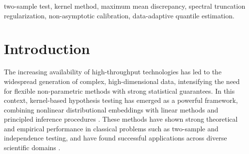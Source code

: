 \documentclass[twoside,11pt]{article}
\begin{document}
\begin{abstract}%
Kernel methods provide a flexible and powerful framework for nonparametric statistical testing by embedding probability distributions into a reproducing kernel Hilbert space (RKHS). In this work, we study the kernel two-sample testing problem and focus on a normalized version of the Maximum Mean Discrepancy (MMD) as a test statistic, which scales the discrepancy by the within-group covariance operator to account for data variability. This normalization has been shown to improve test power in both theoretical and empirical settings. Because this normalization requires regularization, we study the non-asymptotic properties of the spectrally truncated normalized MMD (st-nMMD) and derive an exponential upper bound under the null hypothesis. Thanks to this result we propose a sharp and explicit upper bound for the corresponding non-asymptotic quantile, along with a data-adaptive estimator. We further propose an algorithm to tune the hyperparameters involved in the quantile estimation, including the truncation level, without requiring data splitting. We demonstrate the performance of the st-nMMD through numerical experiments under both the null and alternative hypotheses.
\end{abstract}


\begin{keywords}
  two-sample test, kernel method, maximum mean discrepancy, spectral truncation regularization, non-asymptotic calibration, data-adaptive quantile estimation. 
\end{keywords}


\section{Introduction}\label{sec:intro}
The increasing availability of high-throughput technologies has led to the widespread generation of complex, high-dimensional data, intensifying the need for flexible non-parametric methods with strong statistical guarantees. In this context, kernel-based hypothesis testing has emerged as a powerful framework, combining nonlinear distributional embeddings with linear methods and principled inference procedures \citep{muandet2017kernel}. These methods have shown strong theoretical and empirical performance in classical problems such as two-sample and independence testing, and have found successful applications across diverse scientific domains \citep{fromont2012kernels,zhang2011kernel, ozier2024kernel}.
\end{document}
